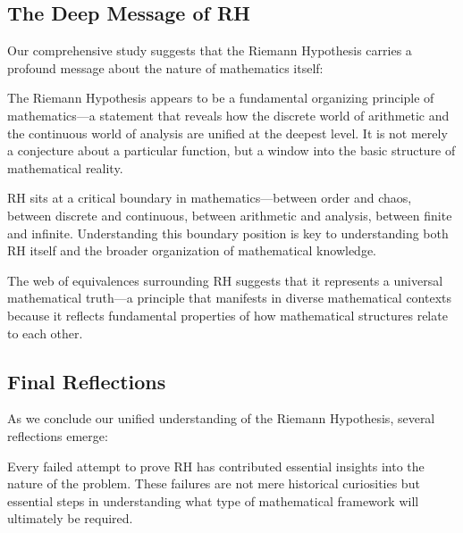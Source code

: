 \subsection{The Deep Message of RH}
\label{subsec:deep_message}

Our comprehensive study suggests that the Riemann Hypothesis carries a profound message about the nature of mathematics itself:

\begin{insight}
The Riemann Hypothesis appears to be a fundamental organizing principle of mathematics—a statement that reveals how the discrete world of arithmetic and the continuous world of analysis are unified at the deepest level. It is not merely a conjecture about a particular function, but a window into the basic structure of mathematical reality.
\end{insight}

\begin{insight}
RH sits at a critical boundary in mathematics—between order and chaos, between discrete and continuous, between arithmetic and analysis, between finite and infinite. Understanding this boundary position is key to understanding both RH itself and the broader organization of mathematical knowledge.
\end{insight}

\begin{insight}
The web of equivalences surrounding RH suggests that it represents a universal mathematical truth—a principle that manifests in diverse mathematical contexts because it reflects fundamental properties of how mathematical structures relate to each other.
\end{insight}

\subsection{Final Reflections}
\label{subsec:final_reflections}

As we conclude our unified understanding of the Riemann Hypothesis, several reflections emerge:

\begin{reflection}
Every failed attempt to prove RH has contributed essential insights into the nature of the problem. These failures are not mere historical curiosities but essential steps in understanding what type of mathematical framework will ultimately be required.
\end{reflection}

